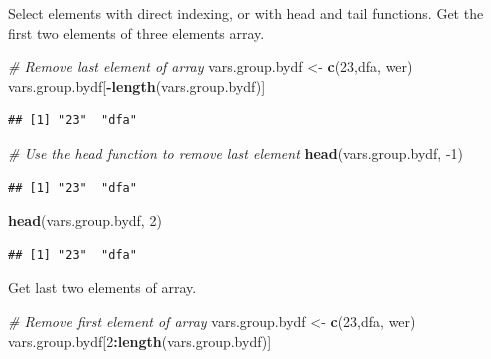\documentclass[
]{book}
\newenvironment{Shaded}{\begin{snugshade}}{\end{snugshade}}
\newcommand{\CommentTok}[1]{\textcolor[rgb]{0.56,0.35,0.01}{\textit{#1}}}
\newcommand{\DecValTok}[1]{\textcolor[rgb]{0.00,0.00,0.81}{#1}}
\newcommand{\KeywordTok}[1]{\textcolor[rgb]{0.13,0.29,0.53}{\textbf{#1}}}
\newcommand{\NormalTok}[1]{#1}
\newcommand{\OperatorTok}[1]{\textcolor[rgb]{0.81,0.36,0.00}{\textbf{#1}}}
\newcommand{\StringTok}[1]{\textcolor[rgb]{0.31,0.60,0.02}{#1}}
\begin{document}
Select elements with direct indexing, or with head and tail functions. Get the first two elements of three elements array.

\begin{Shaded}
\begin{Highlighting}[]
\CommentTok{\# Remove last element of array}
\NormalTok{vars.group.bydf \textless{}{-}}\StringTok{ }\KeywordTok{c}\NormalTok{(}\StringTok{\textquotesingle{}23\textquotesingle{}}\NormalTok{,}\StringTok{\textquotesingle{}dfa\textquotesingle{}}\NormalTok{, }\StringTok{\textquotesingle{}wer\textquotesingle{}}\NormalTok{)}
\NormalTok{vars.group.bydf[}\OperatorTok{{-}}\KeywordTok{length}\NormalTok{(vars.group.bydf)]}
\end{Highlighting}
\end{Shaded}

\begin{verbatim}
## [1] "23"  "dfa"
\end{verbatim}

\begin{Shaded}
\begin{Highlighting}[]
\CommentTok{\# Use the head function to remove last element}
\KeywordTok{head}\NormalTok{(vars.group.bydf, }\DecValTok{{-}1}\NormalTok{)}
\end{Highlighting}
\end{Shaded}

\begin{verbatim}
## [1] "23"  "dfa"
\end{verbatim}

\begin{Shaded}
\begin{Highlighting}[]
\KeywordTok{head}\NormalTok{(vars.group.bydf, }\DecValTok{2}\NormalTok{)}
\end{Highlighting}
\end{Shaded}

\begin{verbatim}
## [1] "23"  "dfa"
\end{verbatim}

Get last two elements of array.

\begin{Shaded}
\begin{Highlighting}[]
\CommentTok{\# Remove first element of array}
\NormalTok{vars.group.bydf \textless{}{-}}\StringTok{ }\KeywordTok{c}\NormalTok{(}\StringTok{\textquotesingle{}23\textquotesingle{}}\NormalTok{,}\StringTok{\textquotesingle{}dfa\textquotesingle{}}\NormalTok{, }\StringTok{\textquotesingle{}wer\textquotesingle{}}\NormalTok{)}
\NormalTok{vars.group.bydf[}\DecValTok{2}\OperatorTok{:}\KeywordTok{length}\NormalTok{(vars.group.bydf)]}
\end{Highlighting}
\end{Shaded}
\end{document}
